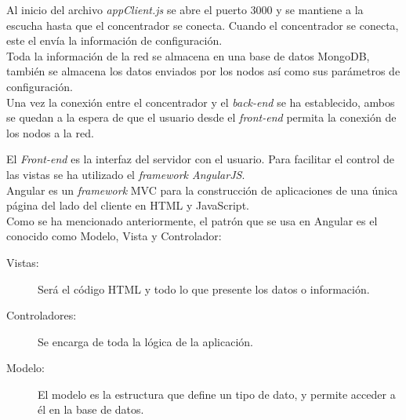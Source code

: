 Al inicio del archivo \textit{appClient.js} se abre el puerto 3000 y se mantiene a la escucha hasta que el concentrador se conecta. Cuando el concentrador se conecta, este el envía la información de configuración. \\

Toda la información de la red se almacena en una base de datos MongoDB\R, también se almacena los datos enviados por los nodos así como sus parámetros de configuración.\\

Una vez la conexión entre el concentrador y el \textit{back-end} se ha establecido, ambos se quedan a la espera de que el usuario desde el \textit{front-end} permita la conexión de los nodos a la red.



El \textit{Front-end} es la interfaz del servidor con el usuario. Para facilitar el control de las vistas se ha utilizado el \textit{framework AngularJS}.\\

Angular es un \textit{framework} \ac{MVC} para la construcción de aplicaciones de una única página del lado del cliente en HTML y JavaScript.\\

Como se ha mencionado anteriormente, el patrón que se usa en Angular es el conocido como Modelo, Vista y Controlador:

\begin{description}
	\item[Vistas: ] Será el código HTML y todo lo que presente los datos o información.
	\item[Controladores: ] Se encarga de toda la lógica de la aplicación.
	\item[Modelo: ] El modelo es la estructura que define un tipo de dato, y permite acceder a él en la base de datos.
\end{description}


